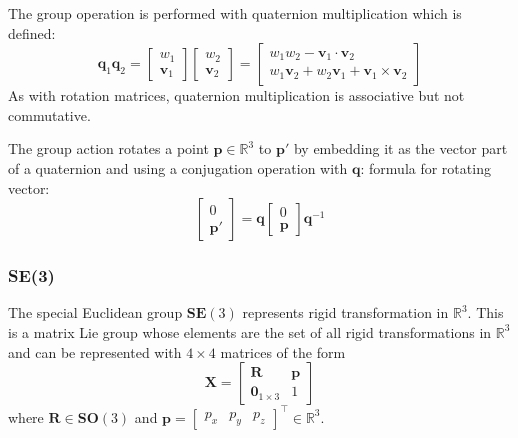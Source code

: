 		The group operation is performed with quaternion multiplication which is defined:
		\begin{equation}
			\mathbf{q}_1\mathbf{q}_2 =
			\begin{bmatrix}
			 	w_1 \\
			 	\mathbf{v}_1
			\end{bmatrix} 
			\begin{bmatrix}
			 	w_2 \\
			 	\mathbf{v}_2
			\end{bmatrix} 
			=
			\begin{bmatrix}
			 	w_1w_2 - \mathbf{v}_1 \cdot \mathbf{v}_2 \\
			 	w_1\mathbf{v}_2 + w_2\mathbf{v}_1 + \mathbf{v}_1 \times \mathbf{v}_2
			\end{bmatrix} 
		\end{equation} 
		As with rotation matrices, quaternion multiplication is associative but not commutative.
		
		The group action rotates a point $\mathbf{p} \in \mathbb{R}^3$  to $\mathbf{p}'$ by embedding it as the vector part of a quaternion and using a conjugation operation with $\mathbf{q}$:
		formula for rotating vector:
		\begin{equation} \label{quatrot}
			\begin{bmatrix}
			 	0\\
			 	\mathbf{p'}
			\end{bmatrix}
			= \mathbf{q}
			\begin{bmatrix}
			 	0\\
			 	\mathbf{p}
			\end{bmatrix}
			\mathbf{q}^{-1}
		\end{equation}
		
	\subsubsection{\textbf{SE}(3)}	
		The special Euclidean group $\textbf{SE}(3)$ represents rigid transformation in $\mathbb{R}^3$. This is a matrix Lie group whose elements are the set of all rigid transformations in $\mathbb{R}^3$ and can be represented with $4 \times 4$ matrices of the form
		\begin{equation}
			\textbf{X} = 
			\begin{bmatrix}
				  \mathbf{R}	&	\mathbf{p} \\
				  \textbf{0}_{1 \times 3}		& 	1 
			\end{bmatrix}
		\end{equation}
		where $\mathbf{R} \in \mathbf{SO}(3)$ and 
		$\mathbf{p} = 
		\begin{bmatrix}
			p_x	& p_y & p_z				
		\end{bmatrix}
		^\top \in \mathbb{R}^3$.
		
